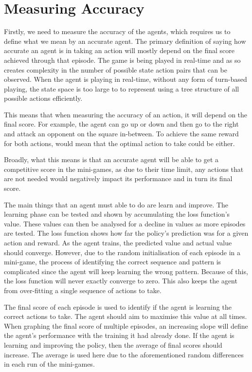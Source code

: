 \section{Measuring Accuracy}

Firstly, we need to measure the accuracy of the agents, which requires us to
define what we mean by an accurate agent. The primary definition of saying how
accurate an agent is in taking an action will mostly depend on the final score
achieved through that episode. The game is being played in real-time and as so
creates complexity in the number of possible state action pairs that can be
observed. When the agent is playing in real-time, without any form of turn-based
playing, the state space is too large to to represent using a tree structure of
all possible actions efficiently.

This means that when measuring the accuracy of an action, it will depend on the
final score. For example, the agent can go up or down and then go to the right
and attack an opponent on the square in-between. To achieve the same reward for
both actions, would mean that the optimal action to take could be either.

Broadly, what this means is that an accurate agent will be able to get a
competitive score in the mini-games, as due to their time limit, any actions
that are not needed would negatively impact its performance and in turn its
final score.

The main things that an agent must able to do are learn and improve. The learning
phase can be tested and shown by accumulating the loss function's value. These
values can then be analysed for a decline in values as more episodes are tested.
The loss function shows how far the policy's prediction was for a given action
and reward. As the agent trains, the predicted value and actual value should
converge. However, due to the random initialisation of each episode in a
mini-game, the process of identifying the correct sequence and pattern is
complicated since the agent will keep learning the wrong pattern. Because of this,
the loss function will never exactly converge to zero. This also keeps the
agent from over-fitting a single sequence of actions to take.

The final score of each episode is used to identify if the agent is learning the
correct actions to take. The agent should aim to maximise this value at all
times. When graphing the final score of multiple episodes, an increasing slope
will define the agent's performance with the training it had already done. If the
agent is learning and improving the policy, then the average of final scores
should increase. The average is used here due to the aforementioned random
differences in each run of the mini-games.

